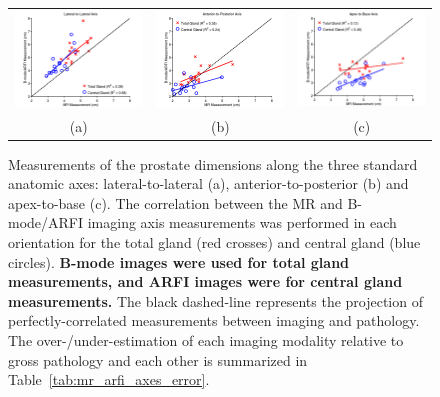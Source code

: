 \begin{figure}
\centering
\begin{tabular}{ccc}
\includegraphics[width=0.3\linewidth]{figs/Imaging_Lateral-to-Lateral} &
\includegraphics[width=0.3\linewidth]{figs/Imaging_Anterior-to-Posterior} &
\includegraphics[width=0.3\linewidth]{figs/Imaging_Apex-to-Base} \\
(a) & (b) & (c) \\
\end{tabular}
\caption{Measurements of the prostate dimensions along the three standard
    anatomic axes: lateral-to-lateral (a), anterior-to-posterior (b) and
    apex-to-base (c).  The correlation between the MR and B-mode/ARFI imaging
    axis measurements was performed in each orientation for the total gland
    (red crosses) and central gland (blue circles).  \textbf{B-mode images were
        used for total gland measurements, and ARFI images were for central
        gland measurements.} The black dashed-line represents the projection of
    perfectly-correlated measurements between imaging and pathology.  The
    over-/under-estimation of each imaging modality relative to gross pathology
    and each other is summarized in Table~\ref{tab:mr_arfi_axes_error}.} 
\label{fig:mr_arfi_path_axes}
\end{figure}
